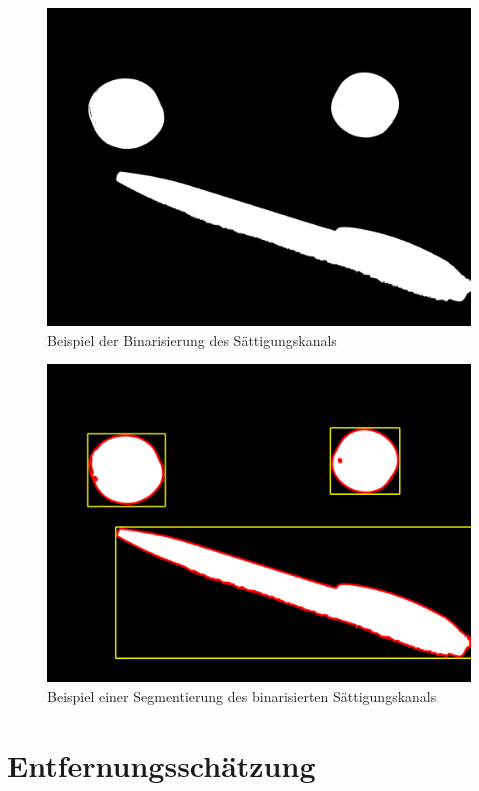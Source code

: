 \begin{figure}[h]
\centering
\includegraphics[width=\textwidth/2]{Bilder/Software/ColormodelsBinarized}
\caption{Beispiel der Binarisierung des Sättigungskanals}
\label{fig:BinarizedColorModels}
\end{figure}
\begin{figure}[h]
\centering
\includegraphics[width=\textwidth/2]{Bilder/Software/ColormodelsSegmentated}
\caption{Beispiel einer Segmentierung des binarisierten Sättigungskanals}
\label{fig:SegmentedColorModels}
\end{figure}


\section{Entfernungsschätzung}
